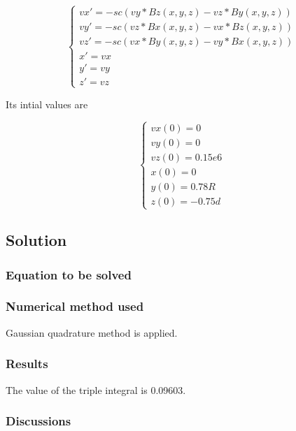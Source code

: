 \documentclass[12pt]{article}
\begin{document}
\begin{equation}
    \begin{cases}
        vx'=-sc(vy*Bz(x,y,z)-vz*By(x,y,z))\\
        vy'=-sc(vz*Bx(x,y,z)-vx*Bz(x,y,z))\\
        vz'=-sc(vx*By(x,y,z)-vy*Bx(x,y,z))\\
        x'=vx\\
        y'=vy\\
        z'=vz
    \end{cases}
\end{equation}

Its intial values are

\begin{equation}
    \begin{cases}
        vx(0)=0\\
        vy(0)=0\\
        vz(0)=0.15e6\\
        x(0)=0\\
        y(0)=0.78R\\
        z(0)=-0.75d
    \end{cases}
\end{equation}
\subsection{Solution}
\subsubsection{Equation to be solved}

\indent


\subsubsection{Numerical method used}
Gaussian quadrature method is applied.

\subsubsection{Results}

The value of the triple integral is 0.09603.


\subsubsection{Discussions}

\end{document}
